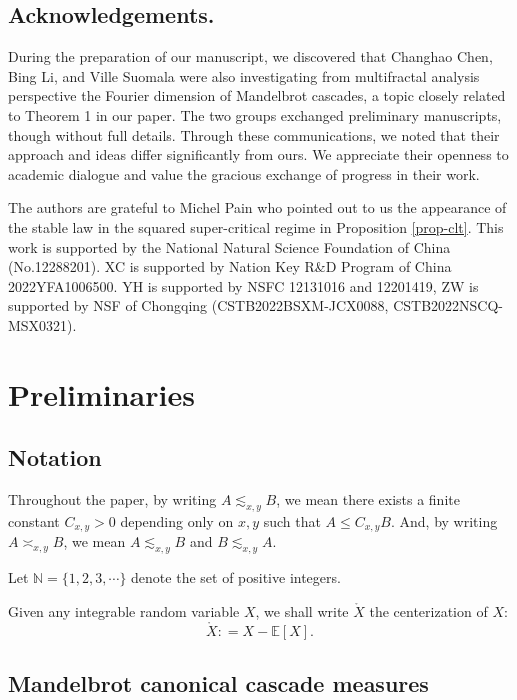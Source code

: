 \documentclass[12pt]{amsart}
\theoremstyle{definition}
\theoremstyle{remark}
\newcommand{\N}{\mathbb{N}}
\newcommand{\E}{\mathbb{E}}
\numberwithin{equation}{section}
\begin{document}
\subsection*{Acknowledgements.} 
During the preparation of our manuscript, we discovered that Changhao Chen, Bing Li, and Ville Suomala were also investigating from multifractal analysis perspective the Fourier dimension of Mandelbrot cascades, a topic closely related to Theorem 1 in our paper. The two groups exchanged preliminary manuscripts, though without full details. Through these communications, we noted that their approach and ideas differ significantly from ours. We appreciate their openness to academic dialogue and value the gracious exchange of progress in their work.

The authors are grateful to  Michel Pain  who pointed out to us the appearance of the stable law in the squared super-critical regime in  Proposition \ref{prop-clt}.  This work is supported by the National Natural Science Foundation of China (No.12288201). XC is supported by Nation Key R\&D Program of China 2022YFA1006500. YH is supported by NSFC 12131016 and 12201419,  ZW is supported by NSF of Chongqing (CSTB2022BSXM-JCX0088,
CSTB2022NSCQ-MSX0321).   


\section{Preliminaries}\label{sec-pre}
\subsection{Notation}


Throughout the paper, by writing $A\lesssim_{x,y} B$, we mean there exists a finite constant $C_{x,y}>0$ depending only on $x,y$ such that $A \le C_{x,y}B$. And, by writing  $A \asymp_{x,y} B$, we mean  $A\lesssim_{x,y}B$ and $B\lesssim_{x,y} A$.


Let $\N = \{1, 2, 3, \cdots\}$ denote the set of positive integers.  

Given any integrable random variable $X$, we shall write $\mathring{X}$ the centerization of $X$: 
\[
\mathring{X}: = X-\E[X]. 
\]



\subsection{Mandelbrot  canonical  cascade measures}\label{sec-Mandelbrot-cascade}
\end{document}
